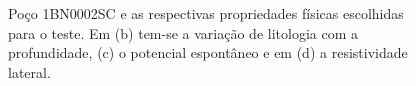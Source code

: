 \begin{figure}[H]
	\qquad
	\qquad
	\caption{Poço 1BN0002SC e as respectivas propriedades físicas escolhidas para o teste. Em (b) tem-se a variação de litologia com a profundidade, (c) o potencial espontâneo e em (d) a resistividade lateral.   } 
	\label{1BN0002SCa}
\end{figure}


